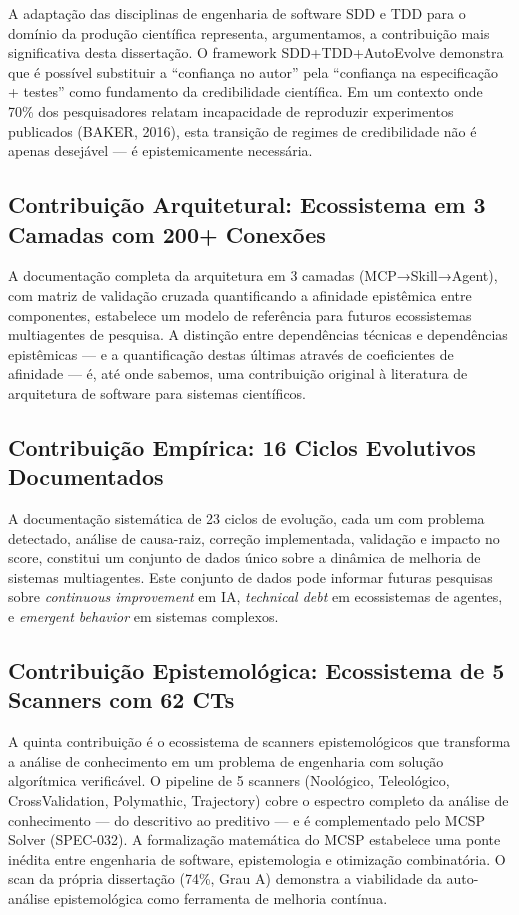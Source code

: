 A adaptação das disciplinas de engenharia de software SDD e TDD para o domínio da produção científica representa, argumentamos, a contribuição mais significativa desta dissertação. O framework SDD+\-TDD+\-Auto\-Evolve demonstra que é possível substituir a ``confiança no autor'' pela ``confiança na especificação + testes'' como fundamento da credibilidade científica. Em um contexto onde 70\% dos pesquisadores relatam incapacidade de reproduzir experimentos publicados (BAKER, 2016), esta transição de regimes de credibilidade não é apenas desejável --- é epistemicamente necessária.

\subsection{Contribuição Arquitetural: Ecossistema em 3 Camadas com 200+ Conexões}

A documentação completa da arquitetura em 3 camadas (MCP→Skill→Agent), com matriz de validação cruzada quantificando a afinidade epistêmica entre componentes, estabelece um modelo de referência para futuros ecossistemas multiagentes de pesquisa. A distinção entre dependências técnicas e dependências epistêmicas --- e a quantificação destas últimas através de coeficientes de afinidade --- é, até onde sabemos, uma contribuição original à literatura de arquitetura de software para sistemas científicos.

\subsection{Contribuição Empírica: 16 Ciclos Evolutivos Documentados}

A documentação sistemática de 23 ciclos de evolução, cada um com problema detectado, análise de causa-raiz, correção implementada, validação e impacto no score, constitui um conjunto de dados único sobre a dinâmica de melhoria de sistemas multiagentes. Este conjunto de dados pode informar futuras pesquisas sobre \textit{continuous improvement} em IA, \textit{technical debt} em ecossistemas de agentes, e \textit{emergent behavior} em sistemas complexos.

\subsection{Contribuição Epistemológica: Ecossistema de 5 Scanners com 62 CTs}

A quinta contribuição é o ecossistema de scanners epistemológicos que transforma a análise de conhecimento em um problema de engenharia com solução algorítmica verificável. O pipeline de 5 scanners (Noológico, Teleológico, CrossValidation, Polymathic, Trajectory) cobre o espectro completo da análise de conhecimento --- do descritivo ao preditivo --- e é complementado pelo MCSP Solver (SPEC-032). A formalização matemática do MCSP estabelece uma ponte inédita entre engenharia de software, epistemologia e otimização combinatória. O scan da própria dissertação (74\%, Grau A) demonstra a viabilidade da auto-análise epistemológica como ferramenta de melhoria contínua.


